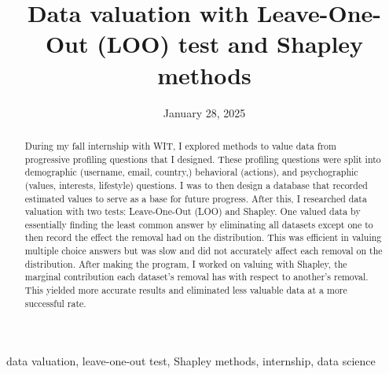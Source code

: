 ﻿\documentclass[12pt,conference,onecolumn]{IEEEtran}
\title{Data valuation with Leave-One-Out (LOO) test and Shapley methods}
\author{%
\IEEEauthorblockN{Nathan Martin}\IEEEauthorblockA{Science \& Engineering\\Manalapan High School\\Englishtown, NJ\\425nmartin@frhsd.com}}
\date{January 28, 2025}
\newcommand{\keywords}{data valuation, leave-one-out test, Shapley methods, internship, data science}
\begin{document}
\maketitle 

\begin{abstract}
During my fall internship with WIT, I explored methods to value  data from progressive profiling questions that I designed. These profiling questions were split into demographic (username, email, country,) behavioral (actions), and psychographic (values, interests, lifestyle) questions. I was to then design a database that recorded estimated values to serve as a base for future progress. After this, I researched data valuation with two tests: Leave-One-Out (LOO) and Shapley. One valued data by essentially finding the least common answer by eliminating all datasets except one to then record the effect the removal had on the distribution. This was efficient in valuing multiple choice answers but was slow and did not accurately affect each removal on the distribution. After making the program, I worked on valuing with Shapley, the marginal contribution each dataset’s removal has with respect to another’s removal. This yielded more accurate results and eliminated less valuable data at a more successful rate.
\end{abstract}

\begin{IEEEkeywords}
\keywords
\end{IEEEkeywords}
\end{document}
